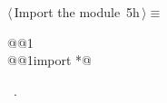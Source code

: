 \documentclass[11pt,oneside]{article}	%
\begin{document}
\begin{flushleft} \small \label{scrap21}
\protect{}$\langle\,$Import the module\nobreak\ {\footnotesize 5h}$\,\rangle\equiv$
\vspace{-1ex}
\begin{list}{}{} \item
\mbox{}\verb@import @@1\verb@@\\
\mbox{}\verb@from @@1\verb@ import *@\\
\mbox{}\verb@@{\NWsep}
\end{list}
\vspace{-1ex}
\footnotesize\addtolength{\baselineskip}{-1ex}
\begin{list}{}{\setlength{\itemsep}{-\parsep}\setlength{\itemindent}{-\leftmargin}}
\item \NWtxtMacroRefIn\ .
\end{list}
\end{flushleft}



\end{document}

